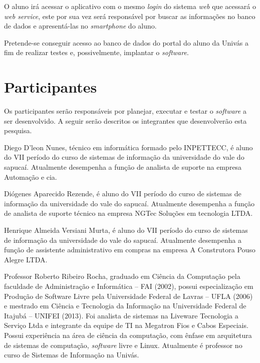 	\par O aluno irá acessar o aplicativo com o mesmo \textit{login} do sistema
\textit{web} que acessará o \textit{web service}, este por sua vez será
responsável por buscar as informações no banco de dados e apresentá-las no
\textit{smartphone} do aluno. 
	
	\par Pretende-se conseguir acesso ao banco de dados do portal do aluno da
Univás a fim de realizar testes e, possivelmente, implantar o \textit{software}.


\section{Participantes}

	\par Os participantes serão responsáveis por planejar, executar e testar o
\textit{software} a ser desenvolvido. A seguir serão descritos os integrantes
que desenvolverão esta pesquisa.

	\par Diego D’leon Nunes, técnico em informática formado pelo INPETTECC, é aluno
do VII período do curso de sistemas de informação da universidade do vale do
sapucaí. Atualmente desempenha a função de analista de suporte na empresa
Automação e cia.

	\par Diógenes Aparecido Rezende, é aluno do VII período do curso de sistemas de
informação da universidade do vale do sapucaí. Atualmente desempenha a função de 
analista de suporte técnico na empresa NGTec Soluções em tecnologia LTDA.

	\par Henrique Almeida Versiani Murta, é aluno do VII período do curso de
sistemas de informação da universidade do vale do sapucaí. Atualmente
desempenha a função de assistente administrativo em compras na empresa A
Construtora Pouso Alegre LTDA.

	\par Professor Roberto Ribeiro Rocha, graduado em Ciência da Computação pela
faculdade de Administração e Informática – FAI (2002), possui especialização em
Produção de Software Livre pela Universidade Federal de Lavras – UFLA (2006) e
mestrado em Ciência e Tecnologia da Informação na Universidade Federal de
Itajubá – UNIFEI (2013). Foi analista de sistemas na Liveware Tecnologia a
Serviço Ltda e integrante da equipe de TI na Megatron Fios e Cabos Especiais.
Possui experiência na área de ciência da computação, com ênfase em arquitetura
de sistemas de computação, \textit{software} livre e Linux. Atualmente é
professor no curso de Sistemas de Informação na Univás.
	
